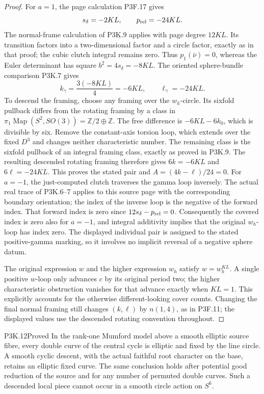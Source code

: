 \begin{proof}
For \(a=1\), the page calculation P3F.17 gives
\[
 s_\delta=-2KL,\qquad p_{\rm rel}=-24KL.
\]
The normal-frame calculation of P3K.9 applies with page degree
\(12KL\).  Its transition factors into a two-dimensional
factor and a circle factor, exactly as in that proof;
the cubic clutch integral remains zero.  Thus
\(p_1(\bar\nu)=0\), whereas the Euler determinant has
square \(b^2=4s_\delta=-8KL\).  The oriented sphere-bundle
comparison P3K.7 gives
\[
 k_\gamma=\frac{3(-8KL)}4=-6KL,
 \qquad \ell_\gamma=-24KL.
\]
To descend the framing, choose any framing over the
\(w_h\)-circle.  Its sixfold pullback differs from the
rotating framing by a class in
\(\pi_1\operatorname{Map}(S^2,SO(3))=\mathbb Z/2\oplus\mathbb Z\).
The free difference is \(-6KL-6k_0\), which is divisible
by six.  Remove the constant-axis torsion loop, which extends
over the fixed \(D^3\) and changes neither characteristic
number.  The remaining class is the sixfold pullback of an
integral framing class, exactly as proved in P3K.9.  The
resulting descended rotating framing therefore gives
\(6k=-6KL\) and \(6\ell=-24KL\).  This proves the
stated pair and \(A=(4k-\ell)/24=0\).  For \(a=-1\),
the just-computed clutch traverses the gamma loop inversely.
The actual real trace of P3K.6--7 applies to this source
page with the corresponding boundary orientation; the index
of the inverse loop is the negative of the forward index.
That forward index is zero since
\(12s_\delta-p_{\rm rel}=0\).  Consequently the covered
index is zero also for \(a=-1\), and integral additivity
implies that the original \(w_h\)-loop has index zero.
The displayed individual pair is assigned to the stated
positive-gamma marking, so it involves no implicit reversal
of a negative sphere datum.

The original expression \(w\) and the higher expression
\(w_h\) satisfy \(w=w_h^{KL}\).  A single positive
\(w\)-loop only advances \(c\) by its original period two;
the higher characteristic obstruction vanishes for that
advance exactly when \(KL=1\).  This explicitly accounts
for the otherwise different-looking cover counts.  Changing
the final normal framing still changes \((k,\ell)\) by
\(n(1,4)\), as in P3F.11; the displayed values use the
descended rotating convention throughout.
\end{proof}

\begin{statement}{P3K.12}{Proved}
In the rank-one Mumford model above a smooth elliptic source fibre,
every double curve of the central cycle is elliptic and fixed by the
line circle.  A smooth cyclic descent, with the actual faithful root
character on the base, retains an elliptic fixed curve.  The same
conclusion holds after potential good reduction of the source and
for any number of permuted double curves.  Such a descended local
piece cannot occur in a smooth circle action on \(S^6\).
\end{statement}

